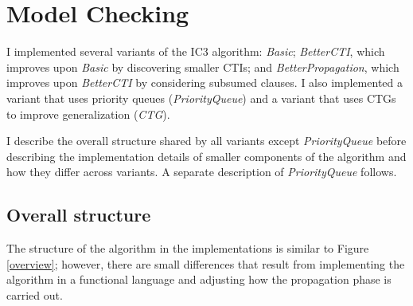 \documentclass[12pt,a4paper,twoside,openright]{report}
\begin{document}
{{\section{Model Checking}
\label{impl:modelchecker}

I implemented several variants of the IC3 algorithm:
\emph{Basic}; \emph{BetterCTI}, which improves upon \emph{Basic} by discovering
smaller CTIs; and \emph{BetterPropagation}, which improves upon \emph{BetterCTI}
by considering subsumed clauses.
I also implemented a variant that uses priority queues (\emph{PriorityQueue})
and a variant that uses CTGs to improve generalization (\emph{CTG}).

I describe the overall structure shared by all variants except
\emph{PriorityQueue} before describing the implementation
details of smaller components of the algorithm and how they differ across
variants. A separate description of \emph{PriorityQueue}
follows.

\subsection{Overall structure}

The structure of the algorithm in the implementations is similar
to Figure \ref{overview}; however, there are
small differences that result from implementing the algorithm in a
functional language and adjusting how the propagation phase is
carried out.

}}
\end{document}
